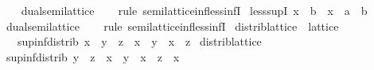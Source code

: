 \begin{isabellebody}
%
\isadelimproof
\ \ %
\endisadelimproof
%
\isatagproof
{}\isamarkupfalse%
\ dual{\isacharunderscore}{\kern0pt}semilattice\isanewline
\ \ \isamarkupfalse%
\ {\isacharparenleft}{\kern0pt}rule\ semilattice{\isacharunderscore}{\kern0pt}inf{\isachardot}{\kern0pt}less{\isacharunderscore}{\kern0pt}infI{}{\isacharparenright}{\kern0pt}%
\endisatagproof
{\isafoldproof}%
%
\isadelimproof
\isanewline
%
\endisadelimproof
\isanewline
{}\isamarkupfalse%
\ less{\isacharunderscore}{\kern0pt}supI{}{\isacharcolon}{\kern0pt}\ {\isachardoublequoteopen}x\ {\isacharless}{\kern0pt}\ b\ {\isasymLongrightarrow}\ x\ {\isacharless}{\kern0pt}\ a\ {\isasymsqunion}\ b{\isachardoublequoteclose}\isanewline
%
\isadelimproof
\ \ %
\endisadelimproof
%
\isatagproof
{}\isamarkupfalse%
\ dual{\isacharunderscore}{\kern0pt}semilattice\isanewline
\ \ \isamarkupfalse%
\ {\isacharparenleft}{\kern0pt}rule\ semilattice{\isacharunderscore}{\kern0pt}inf{\isachardot}{\kern0pt}less{\isacharunderscore}{\kern0pt}infI{}{\isacharparenright}{\kern0pt}%
\endisatagproof
{\isafoldproof}%
%
\isadelimproof
\isanewline
%
\endisadelimproof
\isanewline
{}\isamarkupfalse%
%
\isadelimdocument
%
\endisadelimdocument
%
\isatagdocument
%
\isamarkuptrue%
%
\endisatagdocument
{\isafolddocument}%
%
\isadelimdocument
%
\endisadelimdocument
{}\isamarkupfalse%
\ distrib{\isacharunderscore}{\kern0pt}lattice\ {\isacharequal}{\kern0pt}\ lattice\ {\isacharplus}{\kern0pt}\isanewline
\ \ \ sup{\isacharunderscore}{\kern0pt}inf{\isacharunderscore}{\kern0pt}distrib{}{\isacharcolon}{\kern0pt}\ {\isachardoublequoteopen}x\ {\isasymsqunion}\ {\isacharparenleft}{\kern0pt}y\ {\isasymsqinter}\ z{\isacharparenright}{\kern0pt}\ {\isacharequal}{\kern0pt}\ {\isacharparenleft}{\kern0pt}x\ {\isasymsqunion}\ y{\isacharparenright}{\kern0pt}\ {\isasymsqinter}\ {\isacharparenleft}{\kern0pt}x\ {\isasymsqunion}\ z{\isacharparenright}{\kern0pt}{\isachardoublequoteclose}\isanewline
\isanewline
{}\isamarkupfalse%
\ distrib{\isacharunderscore}{\kern0pt}lattice\isanewline
{}\isanewline
\isanewline
{}\isamarkupfalse%
\ sup{\isacharunderscore}{\kern0pt}inf{\isacharunderscore}{\kern0pt}distrib{}{\isacharcolon}{\kern0pt}\ {\isachardoublequoteopen}{\isacharparenleft}{\kern0pt}y\ {\isasymsqinter}\ z{\isacharparenright}{\kern0pt}\ {\isasymsqunion}\ x\ {\isacharequal}{\kern0pt}\ {\isacharparenleft}{\kern0pt}y\ {\isasymsqunion}\ x{\isacharparenright}{\kern0pt}\ {\isasymsqinter}\ {\isacharparenleft}{\kern0pt}z\ {\isasymsqunion}\ x{\isacharparenright}{\kern0pt}{\isachardoublequoteclose}\isanewline

\end{isabellebody}
